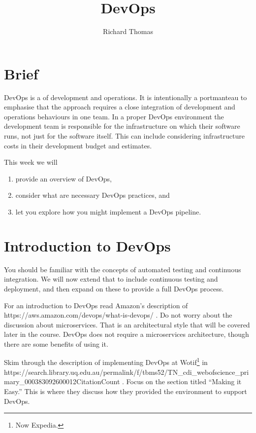 \documentclass{csse4400}
\title{DevOps}
\author{Richard Thomas}
\date{\week{4}}
\begin{document}
\maketitle

\section{Brief}
DevOps is a  of development and operations.
It is intentionally a portmanteau to emphasise that the approach requires a close integration
of development and operations behaviours in one team.
In a proper DevOps environment the development team is responsible for the infrastructure on which their software runs,
not just for the software itself.
This can include considering infrastructure costs in their development budget and estimates.

\noindent
This week we will
\begin{enumerate}
    \item provide an overview of DevOps,
    \item consider what are necessary DevOps practices, and
    \item let you explore how you might implement a DevOps pipeline.
\end{enumerate}


\section{Introduction to DevOps}
You should be familiar with the concepts of automated testing and continuous integration.
We will now extend that to include continuous testing and deployment,
and then expand on these to provide a full DevOps process.

For an introduction to DevOps read Amazon's description of 
{https://aws.amazon.com/devops/what-is-devops/} \cite{AWS-DevOps}.
Do not worry about the discussion about microservices.
That is an architectural style that will be covered later in the course.
DevOps does not require a microservices architecture,
though there are some benefits of using it.

Skim through the description of implementing DevOps at Wotif\footnote{Now Expedia.} in
{https://search.library.uq.edu.au/permalink/f/tbms52/TN_cdi_webofscience_primary_000383092600012CitationCount}
\cite{CallananMatt2016DMIE}.
Focus on the section titled ``Making it Easy.''
This is where they discuss how they provided the environment to support DevOps.
\end{document}
